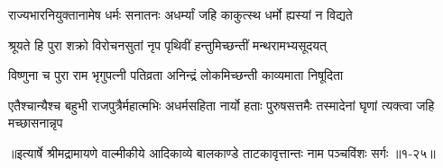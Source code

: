 \twolineshloka
{राज्यभारनियुक्तानामेष धर्मः सनातनः}
{अधर्म्यां जहि काकुत्स्थ धर्मो ह्यस्यां न विद्यते} %

\twolineshloka
{श्रूयते हि पुरा शक्रो विरोचनसुतां नृप}
{पृथिवीं हन्तुमिच्छन्तीं मन्थरामभ्यसूदयत्} %

\twolineshloka
{विष्णुना च पुरा राम भृगुपत्नी पतिव्रता}
{अनिन्द्रं लोकमिच्छन्ती काव्यमाता निषूदिता} %

\threelineshloka
{एतैश्चान्यैश्च बहुभी राजपुत्रैर्महात्मभिः}
{अधर्मसहिता नार्यो हताः पुरुषसत्तमैः}
{तस्मादेनां घृणां त्यक्त्वा जहि मच्छासनान्नृप} %


॥इत्यार्षे श्रीमद्रामायणे वाल्मीकीये आदिकाव्ये बालकाण्डे ताटकावृत्तान्तः नाम पञ्चविंशः सर्गः ॥१-२५॥

